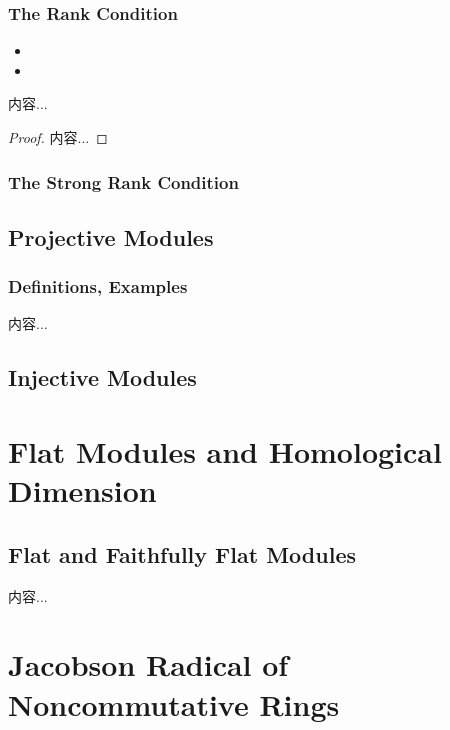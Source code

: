 \documentclass[Total.tex]{subfiles}
\begin{document}
			\subsection{The Rank Condition}
				\begin{Def}
					\begin{itemize}
						\item 
						\item 
					\end{itemize}
				\end{Def}
				
				\begin{proposition}
					内容...
				\end{proposition}
				\begin{proof}
					内容...
				\end{proof}
			\subsection{The Strong Rank Condition}
		\section{Projective Modules}
			\subsection{Definitions, Examples}
				
				\begin{Def}
					内容...
				\end{Def}
		\section{Injective Modules}
	\chapter{Flat Modules and Homological Dimension}
	
		\section{Flat and Faithfully Flat Modules}
			
			\begin{Def}
				内容...
			\end{Def}
	\chapter{Jacobson Radical of Noncommutative Rings}
	
\end{document}
